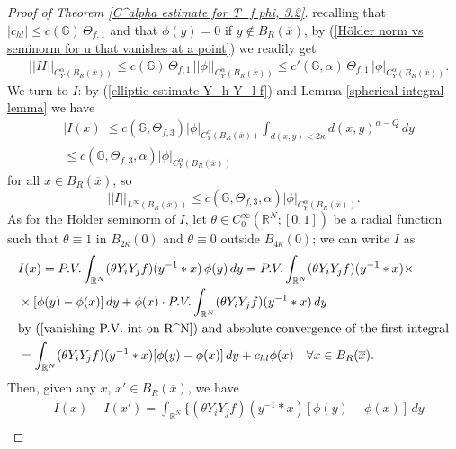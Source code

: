 \documentclass{article}
\numberwithin{equation}{section}
\begin{document}
\begin{proof}[Proof of Theorem \ref{C^alpha estimate for T_f phi, 3.2}]
    recalling that $|c_{hl}| \leq c(\mathbb{G}) \, \Theta_{f,1}$ and that $\phi(y)=0$ if $y \notin B_R(\overline{x})$, by (\ref{Hölder norm vs seminorm for u that vanishes at a point}) we readily get
    \begin{align}
        & \label{Hölder estimate for II} ||II||_{C^{\alpha}_Y(B_R(\overline{x}))} \leq c(\mathbb{G}) \, \Theta_{f,1} \, ||\phi||_{C^{\alpha}_Y(B_R(\overline{x}))}\leq c'(\mathbb{G},\alpha) \, \Theta_{f,1} \, |\phi|_{C^{\alpha}_Y(B_R(\overline{x}))}.
    \end{align}
    We turn to $I$: by (\ref{elliptic estimate Y_h Y_l f}) and Lemma \ref{spherical integral lemma} we have
    \begin{align*}
        & |I(x)| \leq c(\mathbb{G},  \Theta_{f,3}) |\phi|_{C^{\alpha}_Y(B_R(\overline{x}))} \int_{d(x,y)<2\kappa} d(x,y)^{\alpha-Q} \, dy\\
        & \leq c(\mathbb{G}, \Theta_{f,3}, \alpha) |\phi|_{C^{\alpha}_Y(B_R(\overline{x}))}
    \end{align*}
    for all $x \in B_R(\overline{x})$, so
    \begin{equation}
        \label{L^inf estimate for I}
        ||I||_{L^{\infty}(B_R(\overline{x}))} \leq c(\mathbb{G}, \Theta_{f,3}, \alpha) |\phi|_{C^{\alpha}_Y(B_R(\overline{x}))}.
    \end{equation} 
    As for the Hölder seminorm of $I$, let $\theta \in C^{\infty}_{0}(\mathbb{R}^N; [0,1])$ be a radial function such that $\theta \equiv 1$ in $B_{2\kappa}(0)$ and $\theta \equiv 0$ outside $B_{4\kappa}(0)$;
    we can write $I$ as
    \begin{align*}
        & I(x) = P.V. \int_{\mathbb{R}^N} (\theta Y_i Y_j f)(y^{-1}*x) \, \phi(y) \, dy= P.V. \int_{\mathbb{R}^N} (\theta Y_i Y_j f)(y^{-1}*x) \times\\
        & \times [\phi(y)-\phi(x)] \, dy + \phi(x) \cdot P.V. \int_{\mathbb{R}^N} (\theta Y_i Y_j f)(y^{-1}*x) \, dy\\
        & \text{by (\ref{vanishing P.V. int on R^N}) and absolute convergence of the first integral} \\
        & = \int_{\mathbb{R}^N} (\theta Y_i Y_j f)(y^{-1}*x) [\phi(y)-\phi(x)] \, dy + c_{hl} \phi(x)
        \quad \forall x \in B_R(\overline{x}).
    \end{align*}
    Then, given any $x, \, x' \in B_R(\overline{x})$, we have
    \begin{align*}
        & I(x)-I(x') = \int_{\mathbb{R}^N} \{(\theta Y_i Y_j f)(y^{-1}*x) [\phi(y)-\phi(x)] \, dy\\

\end{align*}
\end{proof}
\end{document}

